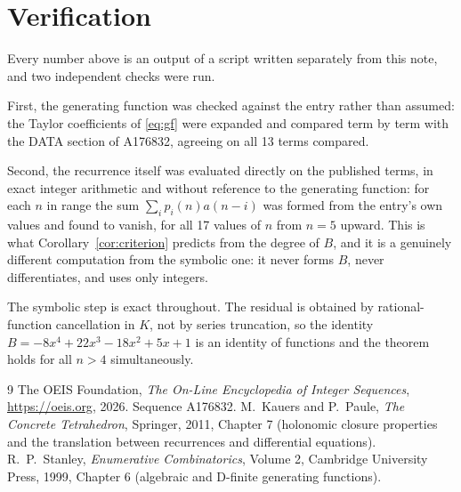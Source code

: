 \documentclass[11pt,a4paper]{article}
\theoremstyle{plain}
\theoremstyle{definition}
\begin{document}
\section{Verification}

Every number above is an output of a script written separately from this note, and two
independent checks were run.

First, the generating function was checked against the entry rather than assumed: the
Taylor coefficients of \eqref{eq:gf} were expanded and compared term by term with the DATA
section of A176832, agreeing on all 13 terms compared.

Second, the recurrence itself was evaluated directly on the published terms, in exact
integer arithmetic and without reference to the generating function: for each $n$ in range
the sum $\sum_{i}p_{i}(n)a(n-i)$ was formed from the entry's own values and found to
vanish, for all 17 values of $n$ from $n=5$ upward. This is what
Corollary~\ref{cor:criterion} predicts from the degree of $B$, and it is a genuinely
different computation from the symbolic one: it never forms $B$, never differentiates, and
uses only integers.

The symbolic step is exact throughout. The residual is obtained by rational-function
cancellation in $K$, not by series truncation, so the identity $B=- 8 x^{4} + 22 x^{3} - 18 x^{2} + 5 x + 1$ is an
identity of functions and the theorem holds for all $n>4$ simultaneously.

\begin{thebibliography}{9}
 The OEIS Foundation, \emph{The On-Line Encyclopedia of Integer Sequences},
\url{https://oeis.org}, 2026. Sequence A176832.
 M.~Kauers and P.~Paule, \emph{The Concrete Tetrahedron}, Springer, 2011,
Chapter 7 (holonomic closure properties and the translation between recurrences and
differential equations).
 R.~P.~Stanley, \emph{Enumerative Combinatorics}, Volume 2, Cambridge
University Press, 1999, Chapter 6 (algebraic and D-finite generating functions).
\end{thebibliography}
\end{document}
